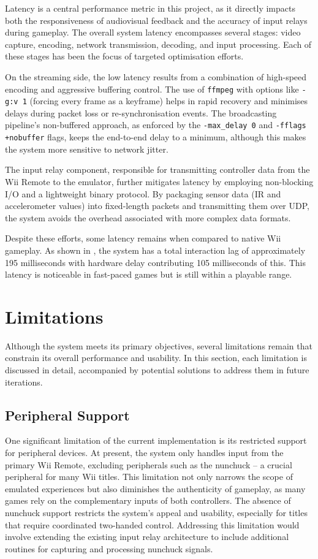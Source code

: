 Latency is a central performance metric in this project, as it directly impacts
both the responsiveness of audiovisual feedback and the accuracy of input relays
during gameplay. The overall system latency encompasses several stages: video
capture, encoding, network transmission, decoding, and input processing. Each of
these stages has been the focus of targeted optimisation efforts.

On the streaming side, the low latency results from a combination of
high-speed encoding and aggressive buffering control. The use of \texttt{ffmpeg}
with options like \texttt{-g:v 1} (forcing every frame as a keyframe) helps in
rapid recovery and minimises delays during packet loss or re-synchronisation
events. The broadcasting pipeline’s non-buffered approach, as enforced by the
\texttt{-max\_delay 0} and \texttt{-fflags +nobuffer} flags, keeps the
end-to-end delay to a minimum, although this makes the system more
sensitive to network jitter.

The input relay component, responsible for transmitting controller data from the
Wii Remote to the emulator, further mitigates latency by employing non-blocking
I/O and a lightweight binary protocol. By packaging sensor data (IR and
accelerometer values) into fixed-length packets and transmitting them over UDP,
the system avoids the overhead associated with more complex data formats.

Despite these efforts, some latency remains when compared to native Wii
gameplay. As shown in , the system has a total
interaction lag of approximately 195 milliseconds with hardware delay
contributing 105 milliseconds of this. This latency is noticeable in fast-paced
games but is still within a playable range.

\section{Limitations}

Although the system meets its primary objectives, several limitations remain that constrain its overall performance and usability. In this section, each limitation is discussed in detail, accompanied by potential solutions to address them in future iterations.

\subsection{Peripheral Support}

One significant limitation of the current implementation is its restricted
support for peripheral devices. At present, the system only handles input from
the primary Wii Remote, excluding peripherals such as the nunchuck -- a crucial peripheral for many Wii
titles. This limitation not only narrows the scope of emulated experiences but
also diminishes the authenticity of gameplay, as many games rely on the
complementary inputs of both controllers. The absence of nunchuck support
restricts the system’s appeal and usability, especially for titles that require
coordinated two-handed control. Addressing this limitation would involve extending
the existing input relay architecture to include additional routines for
capturing and processing nunchuck signals.

